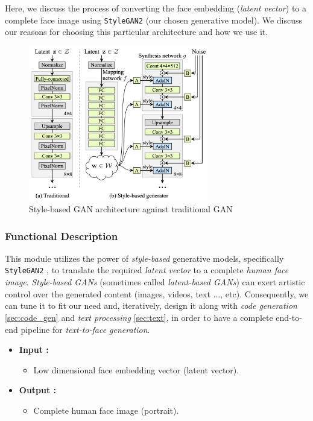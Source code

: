  Here, we discuss the process of converting the face embedding (\emph{latent vector}) to a complete face image using \texttt{StyleGAN2} (our chosen generative model). We discuss our reasons for choosing this particular architecture and how we use it.

\begin{figure}[H]
    \centering
    \includegraphics[width=0.7\textwidth]{images/stylegan.png}
    \caption{Style-based GAN architecture against traditional GAN}
    \label{fig:stylegan}
\end{figure}

\subsubsection{Functional Description}

This module utilizes the power of \emph{style-based} generative models, specifically \texttt{StyleGAN2} \cite{karras2020analyzing}, to translate the required \emph{latent vector} to a complete \emph{human face image}. \emph{Style-based GANs} (sometimes called \emph{latent-based GANs}) can exert artistic control over the generated content (images, videos, text ..., etc). Consequently, we can tune it to fit our need and, iteratively, design it along with \emph{code generation} \ref{sec:code_gen} and \emph{text processing} \ref{sec:text}, in order to have a complete end-to-end pipeline for \emph{text-to-face generation}.

\begin{itemize}
    \item \textbf{Input :}
    \begin{itemize}
        \item Low dimensional face embedding vector (latent vector).
    \end{itemize}
    \item \textbf{Output :}
    \begin{itemize}
        \item Complete human face image (portrait).
    \end{itemize}
\end{itemize}


